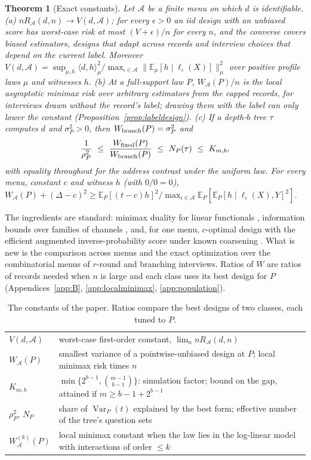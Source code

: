 \documentclass{article}
\newtheorem{theorem}{Theorem}
\newcommand{\E}{\mathbb{E}}
\newcommand{\Var}{\operatorname{Var}}
\newcommand{\A}{\mathcal A}
\begin{document}
\begin{theorem}[Exact constants]\label{thm:char}\label{thm:bracket}
Let $\A$ be a finite menu on which $d$ is identifiable.
\textup{(a)} $nR_\A(d,n)\to V(d,\A)$; for every $\epsilon>0$ an iid design with an unbiased score has worst-case risk at most $(V+\epsilon)/n$ for every $n$, and the converse covers biased estimators, designs that adapt across records and interview choices that depend on the current label. Moreover $V(d,\A)=\sup_{\mu,h}\langle d,h\rangle_\mu^2/\max_{\iota\in\A}\|\E_\mu[h\mid\ell_\iota(X)]\|_\mu^2$ over positive profile laws $\mu$ and witnesses $h$.
\textup{(b)} At a full-support law $P$, $W_\A(P)/n$ is the local asymptotic minimax risk over arbitrary estimators from the capped records, for interviews drawn without the record's label; drawing them with the label can only lower the constant (Proposition~\ref{prop:labeldesign}).
\textup{(c)} If a depth-$b$ tree $\tau$ computes $d$ and $\sigma_P^2>0$, then $W_{\rm branch}(P)=\sigma_P^2$ and
\[
 \frac1{\rho_P^2}\ \le\ \frac{W_{\rm fixed}(P)}{W_{\rm branch}(P)}\ \le\ N_P(\tau)\ \le\ K_{m,b},
\]
with equality throughout for the address contrast under the uniform law. For every menu, constant $c$ and witness $h$ (with $0/0=0$), $W_\A(P)+(\Delta-c)^2\ge\E_P[(t-c)h]^2/\max_{\iota\in\A}\E_P[\E_P[h\mid\ell_\iota(X),Y]^2]$.
\end{theorem}
The ingredients are standard: minimax duality for linear functionals \citep{donoho1994,juditsky2009,polyanskiy2026}, information bounds over families of channels \citep{acharya2019,barnes2020}, and, for one menu, $c$-optimal design with the efficient augmented inverse-probability score under known coarsening \citep{elfving1952,pukelsheim1993,robins1994,tsiatis2006}. What is new is the comparison across menus and the exact optimization over the combinatorial menus of $r$-round and branching interviews. Ratios of $W$ are ratios of records needed when $n$ is large and each class uses its best design for $P$ (Appendices~\ref{app:B}, \ref{app:localminimax}, \ref{app:population}).

\begin{table}[t]
\centering
\caption{The constants of the paper. Ratios compare the best designs of two classes, each tuned to $P$.}
\label{tab:constants}
\footnotesize
\setlength{\tabcolsep}{2.5pt}
\begin{tabular}{lp{6.4cm}}
\toprule
$V(d,\A)$ & worst-case first-order constant, $\lim_n nR_\A(d,n)$\\
$W_\A(P)$ & smallest variance of a pointwise-unbiased design at $P$; local minimax risk times $n$\\
$K_{m,b}$ & $\min\{2^{b-1},\binom{m-1}{b-1}\}$: simulation factor; bound on the gap, attained if $m\ge b-1+2^{b-1}$\\
$\rho_P^2$, $N_P$ & share of $\Var_P(t)$ explained by the best form; effective number of the tree's question sets\\
$W^{(k)}_\A(P)$ & local minimax constant when the law lies in the log-linear model with interactions of order $\le k$\\
\bottomrule
\end{tabular}
\end{table}
\end{document}
